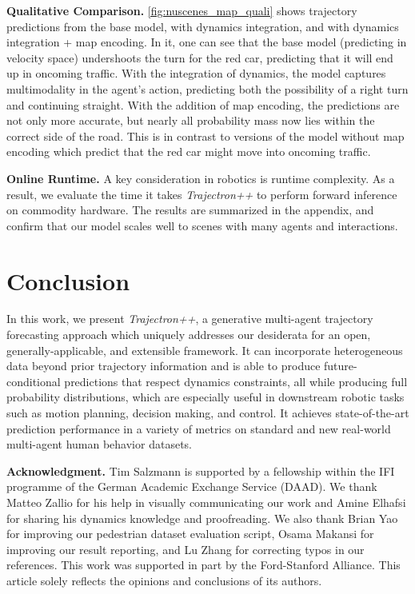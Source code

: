 \documentclass[runningheads]{llncs}
\newcommand{\algname}{\mbox{Trajectron++}}
\newcommand{\emphalgname}{\emph{\algname}}
\begin{document}
{\bf Qualitative Comparison.} \cref{fig:nuscenes_map_quali} shows trajectory predictions from the base model, with dynamics integration, and with dynamics integration + map encoding. 
In it, one can see that the base model (predicting in velocity space) undershoots the turn for the red car, predicting that it will end up in oncoming traffic. 
With the integration of dynamics, the model captures multimodality in the agent's action, predicting both the possibility of a right turn and continuing straight.
With the addition of map encoding, the predictions are not only more accurate, but nearly all probability mass now lies within the correct side of the road. This is in contrast to versions of the model without map encoding which predict that the red car might move into oncoming traffic.

{\bf Online Runtime.} A key consideration in 
robotics is runtime complexity. As a result, we evaluate the time it takes \emphalgname{} to perform forward inference on commodity hardware. The results are summarized in the appendix, and confirm that our model scales well to scenes with many agents and interactions.



\section{Conclusion}
In this work, we present \emphalgname{}, a generative multi-agent trajectory forecasting approach which uniquely addresses our desiderata for an open, generally-applicable, and extensible framework. It can incorporate heterogeneous data beyond prior trajectory information and is able to produce future-conditional predictions that respect dynamics constraints, all
while producing full probability distributions, which are especially useful in downstream robotic tasks such as motion planning, decision making, and control. 
It achieves state-of-the-art prediction performance in a variety of metrics on standard and new real-world multi-agent human behavior datasets.



{\bf Acknowledgment.} 
Tim Salzmann is supported by a fellowship within the IFI programme of the German Academic Exchange Service (DAAD). We thank Matteo Zallio for his help in visually communicating our work and Amine Elhafsi for sharing his dynamics knowledge and proofreading. We also thank Brian Yao for improving our pedestrian dataset evaluation script, Osama Makansi for improving our result reporting, and Lu Zhang for correcting typos in our references. This work was supported in part by the Ford-Stanford Alliance. This article solely reflects the opinions and conclusions of its authors.
\end{document}
